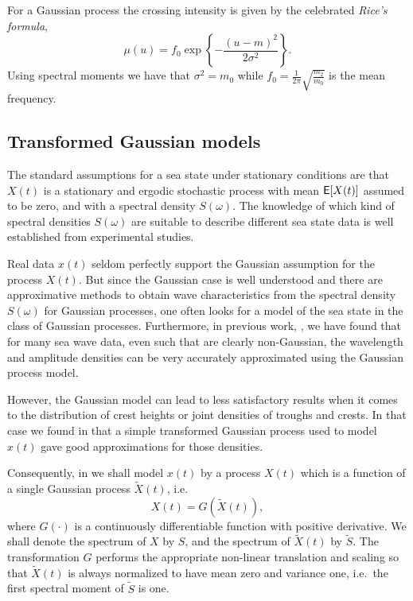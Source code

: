 For a Gaussian process the crossing intensity
is given by the celebrated {\it Rice's formula},
\begin{equation}
\mu(u)=f_0\exp\left\{-\frac{(u-m)^2}{2\sigma^2}\right\}.\label{eq:rice}
\end{equation}
Using spectral moments we have that $\sigma^2=m_0$ while
$f_0=\frac{1}{2\pi}\sqrt{\frac{m_2}{m_0}}$ is the mean frequency.

\subsection{Transformed Gaussian models}\label{ss:transformedGaussianmodels}

The standard assumptions for a sea state under stationary conditions are
that $X(t)$ is a stationary and ergodic stochastic process with
mean $\mbox{\sf E}[X(t)]$ assumed to be zero, and with a spectral density
$S(\omega)$. The knowledge of which kind of spectral densities
$S(\omega)$ are suitable to describe different sea state data is well
established from experimental studies.

Real data $x(t)$ seldom perfectly support the Gaussian assumption for
the process $X(t)$. But since the Gaussian case is well understood
and there are approximative methods to obtain wave characteristics
from the spectral density $S(\omega)$ for Gaussian processes,
one often looks for a model of the sea state in the
class of Gaussian processes. Furthermore, in previous work,
\cite{RychlikEtal1997Modelling},
we have found that for many sea wave data, even such that are clearly
non-Gaussian, the wavelength and amplitude densities can be very
accurately  approximated using the Gaussian process model.

However, the Gaussian model can lead to less satisfactory results
when it comes to the distribution of crest heights or joint densities
of troughs and crests. In that case we found in
\cite{RychlikEtal1997Modelling}
that a simple transformed Gaussian process used to model $x(t)$ gave
good approximations for those densities.

Consequently, in \progname{} we shall model $x(t)$ by a process $X(t)$ which is a
function of a single Gaussian process $\widetilde X (t)$, i.e.\
\begin{equation}\label{eq:trprocess}
X(t)=G(\widetilde X(t)),
\end{equation}
where $G(\cdot)$ is a continuously differentiable function with
positive derivative.  We shall denote the spectrum of $X$ by $S$,
and the spectrum of $\widetilde X (t)$ by $\widetilde S$.
The transformation $G$ performs the appropriate non-linear
translation and scaling so that $\widetilde X(t)$ is always normalized to
have mean zero and variance one, i.e.\ the first spectral moment of
$\widetilde S$ is one.

